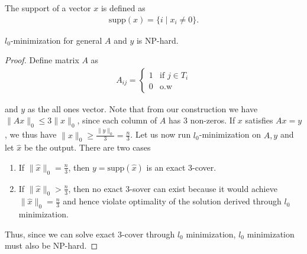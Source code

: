 \begin{definition}
The support of a vector $x$ is defined as
\begin{align*}
\text{supp}(x) = \{i \mid x_i \neq 0 \}.
\end{align*}
\end{definition}

\begin{theorem}
$l_0$-minimization for general $A$ and $y$ is NP-hard.
\end{theorem}
\begin{proof}
Define matrix $A$ as
\begin{align*}
    A_{ij} = \begin{cases}
    1 & \text{if } j \in T_i \\
    0 & \text{o.w}
    \end{cases}
\end{align*}

and $y$ as the all ones vector. Note that from our construction we have $\|Ax\|_0 \leq 3\|x\|_0$, since each column of $A$ has 3 non-zeros. If $x$ satisfies $Ax = y$, we thus have $\|x\|_0 \geq \frac{\|y\|_0}{3} = \frac{n}{3}$. Let us now run $l_0$-minimization on $A, y$ and let $\hat{x}$ be the output. There are two cases

\begin{enumerate}
    \item If $\|\hat{x}\|_0 = \frac{n}{3}$, then $y = \text{supp}(\hat{x})$ is an exact 3-cover. %
    \item If $\| \hat{x}\|_0 > \frac{n}{3}$, then no exact 3-sover can exist because it would achieve $\|\hat{x}\|_0 = \frac{n}{3}$ and hence violate optimality of the solution derived through $l_0$ minimization.
\end{enumerate}

Thus, since we can solve exact 3-cover through $l_0$ minimization, $l_0$ minimization must also be NP-hard.
\end{proof}

